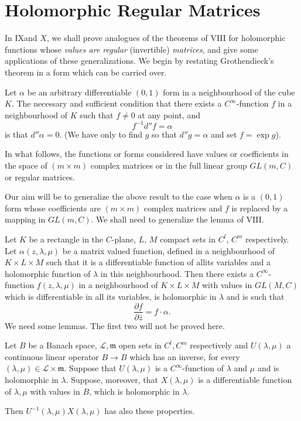 \chapter{Holomorphic Regular Matrices}\label{chap9}

In IX\pageoriginale and $X$, we shall prove analogues of the theorems
of VIII for holomorphic functions whose \textit{values are regular}
(invertible) \textit{matrices}, and give some applications of these
generalizations. We begin by restating Grothendieck's theorem in a
form which can be carried over.

Let $\alpha$ be an arbitrary differentiable $(0,1)$ form in a
neighbourhood of the cube $K$. The necessary and sufficient condition
that there exists a $C^\infty$-function $f$ in a neighbourhood of $K$
such that $f\neq 0$ at any point, and 
$$
f^{-1} d'' f = \alpha
$$
is that $d'' \alpha =0$. (We have only to find $g$ so that $d'' g
=\alpha$ and set $f= \exp g$). 

In what follows, the functions or forms considered have values or
coefficients in the space of $(m \times m)$ complex matrices or in the
full linear group $GL(m,C)$ or regular matrices.

Our aim will be to generalize the above result to the case when
$\alpha$ is a $(0,1)$ form whose coefficients are $(m \times m)$
complex matrices and $f$ is replaced by a mapping in $GL(m,C)$. We
shall need to generalize the lemma of VIII.

\setcounter{thm}{0}
\begin{thm}\label{chap9:thm1}
Let $K$ be a rectangle in the $C$-plane, $L$, $M$ compact sets in
$C^l$, $C^m$ respectively. Let $\alpha (z, \lambda, \mu)$ be a matrix
valued function, defined in a neighbourhood of $K\times L \times M$
such that it is a differentiable function of allits variables and a
holomorphic function of $\lambda$ in this neighbourhood. Then there
exists a $C^\infty$-function $f(z, \lambda, \mu)$ in a neighbourhood
of $K \times L \times M$ with values in $GL(M,C)$ which is
differentiable in all its variables, is holomorphic in $\lambda$ and
is such that 
$$
\frac{\partial f}{\partial \bar{z}} = f \cdot \alpha. 
$$\pageoriginale
We need some lemmas. The first two will not be proved here.
\end{thm}

\setcounter{lem}{0}
\begin{lem}\label{chap9:lem1}
Let $B$ be a Banach space, $\mathscr{L}, \mathfrak{m}$ open sets in
$C^l, C^m$ respectively and $U(\lambda, \mu)$ a continuous linear
operator $B \to B$ which has an inverse, for every $(\lambda, \mu) \in
\mathscr{L} \times \mathfrak{m}$. Suppose that $U(\lambda, \mu)$ is a
$C^\infty$-function of $\lambda$ and $\mu$ and is holomorphic in
$\lambda$. Suppose, moreover, that $X(\lambda, \mu)$ is a
differentiable function of $\lambda, \mu$ with values in $B$, which is
holomorphic in $\lambda$. 

Then $U^{-1} (\lambda, \mu) X (\lambda, \mu)$ has also these
properties. 
\end{lem}

